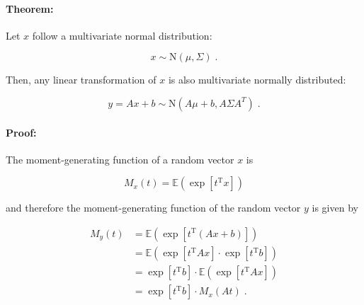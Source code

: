 

\setcounter{equation}{0}



\paragraph{Theorem:}

Let $x$ follow a multivariate normal distribution:

\begin{equation} \label{eq:mvn}
x \sim \mathrm{N}(\mu, \Sigma) \; .
\end{equation}

Then, any linear transformation of $x$ is also multivariate normally distributed:

\begin{equation} \label{eq:mvn-lt}
y = Ax + b \sim \mathrm{N}(A\mu + b, A \Sigma A^T) \; .
\end{equation}


\paragraph{Proof:} The moment-generating function of a random vector $x$ is

\begin{equation} \label{eq:vect-mgf}
M_x(t) = \mathbb{E} \left( \exp \left[ t^\mathrm{T} x \right] \right)
\end{equation}

and therefore the moment-generating function of the random vector $y$ is given by

\vspace{-0.5em}
\begin{equation} \label{eq:y-mfg-s1}
\begin{split}
M_y(t) &= \mathbb{E} \left( \exp \left[ t^\mathrm{T} (Ax + b) \right] \right) \\
&= \mathbb{E} \left( \exp \left[ t^\mathrm{T} A x \right] \cdot \exp \left[ t^\mathrm{T} b \right] \right) \\
&= \exp \left[ t^\mathrm{T} b \right] \cdot \mathbb{E} \left( \exp \left[ t^\mathrm{T} A x \right] \right) \\
&= \exp \left[ t^\mathrm{T} b \right] \cdot M_x(At) \; .
\end{split}
\end{equation}

